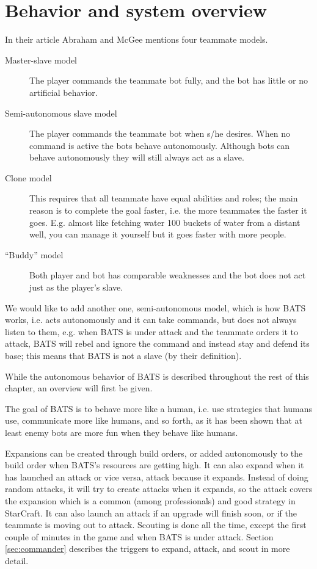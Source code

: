 \section{Behavior and system overview}
In their article\cite{abraham10} Abraham and McGee mentions four teammate models.
\begin{description}
	\item[Master-slave model] The player commands the teammate bot fully, and the bot has little or
	  no artificial behavior.
	\item[Semi-autonomous slave model] The player commands the teammate bot when s/he desires. When
	  no command is active the bots behave autonomously. Although bots can behave autonomously they
	  will still always act as a slave.
	\item[Clone model] This requires that all teammate have equal abilities and roles; the main
	  reason is to complete the goal faster, i.e. the more teammates the faster it goes. E.g. almost
	  like fetching water 100 buckets of water from a distant well, you can manage it yourself but
	  it goes faster with more people.
	\item[“Buddy” model] Both player and bot has comparable weaknesses and the bot does not act just
	  as the player’s slave.
\end{description}
We would like to add another one, semi-autonomous model, which is how BATS works, i.e. acts
autonomously and it can take commands, but does not always listen to them, e.g. when BATS is under
attack and the teammate orders it to attack, BATS will rebel and ignore the command and instead stay
and defend its base; this means that BATS is not a slave (by their definition).

While the autonomous behavior of BATS is described throughout the rest of this chapter, an overview
will first be given.

The goal of BATS is to behave more like a human, i.e. use strategies that humans use, communicate
more like humans, and so forth, as it has been shown that at least enemy bots are more fun when they
behave like humans\cite{soni08}.

Expansions can be created through build orders, or added autonomously to the build order when BATS's
resources are getting high. It can also expand when it has launched an attack or vice versa, attack
because it expands. Instead of doing random attacks, it will try to create attacks when it expands,
so the attack covers the expansion which is a common (among professionals) and good strategy in
StarCraft\cite{day9}. It can also launch an attack if an upgrade will finish soon, or if the
teammate is moving out to attack. Scouting is done all the time, except the first couple of minutes
in the game and when BATS is under attack. Section \ref{sec:commander} 
describes the triggers to expand, attack, and scout in more detail.

